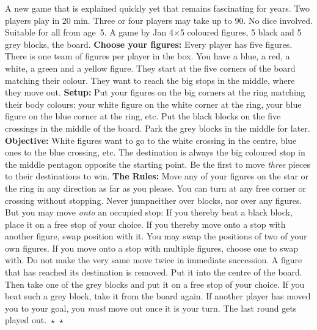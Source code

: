 \shapepar{\starshape}
A new game that is explained quickly yet that 
remains 
fascinating for years. 
Two players play in 20 min. Three or four players
may take up to 90. 
No dice involved. Suitable for all  from
age~5. A game by Jan  
4$\times$5 coloured figures, 5 black and
5 grey blocks, the board.
\textsf{\textbf{Choose your figures: }}
Every player has five figures. There is one team of figures per player in the box. 
You have a blue, a red, a white, a green and a yellow figure. 
They start at the five corners of the board matching their colour.
They want to reach the big stops in the middle, where they move out.
\textsf{\textbf{Setup: } }
Put your figures on the big corners at the ring matching their body colours: 
your white figure on the white corner at the ring, your blue figure on the blue corner at the ring, etc.
Put the black blocks on the five crossings in the middle of the board. 
Park the grey blocks in the middle for later. 
\textsf{\textbf{Objective: }}
White figures want to go to the white crossing in the centre, blue
ones to the blue crossing, etc. The destination is always the big
coloured stop in the middle pentagon opposite the starting point.
Be the first to move \emph{three} pieces to their destinations to win.
\textsf{\textbf{The Rules: }}
Move any of your figures on the star or the ring in any direction as far as you please. 
You can turn at any free corner or crossing without stopping.
Never jump\textemdash neither over blocks, nor over any figures. 
But you may move \emph{onto} an occupied stop:
If you thereby beat a black block, place it on a free stop of your choice.
If you thereby move onto a stop with another figure, swap position with it.
You may swap the positions of two of your own figures. 
If you move onto a stop with multiple figures, choose one to swap with.
Do not make the very same move twice in immediate succession.  
A figure that has reached its destination is removed. Put it into the centre of the board. Then take one of the grey blocks and put it on a free stop of your choice.
If you beat such a grey block, take it from the board again.
If another player has  moved you to your goal, you \emph{must }move out once it is your turn.  
The last round gets played out.
$\!\!\star$   $\star$%